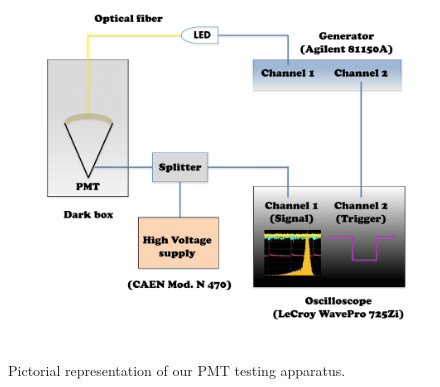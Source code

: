 \documentclass[preprint,12pt]{elsarticle}
\begin{document}
\begin{figure}[!t]
\centering
\includegraphics[width=13.2cm, height=10.0cm]{figures/setup.pdf} 
\caption{Pictorial representation of our PMT testing apparatus.}
\label{fig:setup}
\end{figure}
\end{document}
